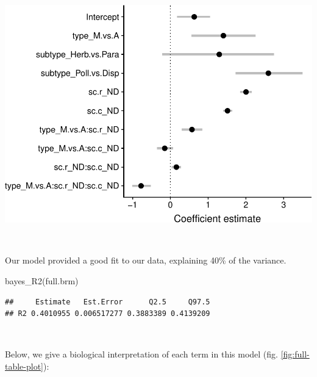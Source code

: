 \documentclass[11pt,]{article}
\newenvironment{Shaded}{}{}
\newcommand{\KeywordTok}[1]{\textcolor[rgb]{0.00,0.00,1.00}{#1}}
\newcommand{\NormalTok}[1]{#1}
\let\origfigure\figure
\let\endorigfigure\endfigure
\renewenvironment{figure}[1][2] {
    \expandafter\origfigure\expandafter[H]
} {
    \endorigfigure
}
\begin{document}
\begin{figure}

{\centering \includegraphics[width=0.75\linewidth]{reproduce_analyses_files/figure-latex/full-table-plot-1} 

}

\caption{Mean and 95\% credible intervals of fixed effects from our full model.}\label{fig:full-table-plot}
\end{figure}

~

Our model provided a good fit to our data, explaining 40\% of the
variance.

\begin{Shaded}
\begin{Highlighting}[]
\KeywordTok{bayes_R2}\NormalTok{(full.brm)}
\end{Highlighting}
\end{Shaded}

\begin{verbatim}
##     Estimate   Est.Error      Q2.5     Q97.5
## R2 0.4010955 0.006517277 0.3883389 0.4139209
\end{verbatim}

~

Below, we give a biological interpretation of each term in this model
(fig. \ref{fig:full-table-plot}):
\end{document}

